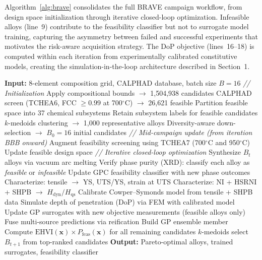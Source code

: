 Algorithm~\ref{alg:brave} consolidates the full BRAVE campaign workflow, from design space initialization through iterative closed-loop optimization. Infeasible alloys (line~9) contribute to the feasibility classifier but not to surrogate model training, capturing the asymmetry between failed and successful experiments that motivates the risk-aware acquisition strategy. The DoP objective (lines~16--18) is computed within each iteration from experimentally calibrated constitutive models, creating the simulation-in-the-loop architecture described in Section~1.

\begin{algorithm}[!htbp]
\caption{BRAVE: Bayesian Risk-Aware Alloy Discovery and Exploration}\label{alg:brave}
\begin{algorithmic}[1]
\Statex \textbf{Input:} 8-element composition grid, CALPHAD database, batch size $B = 16$
\Statex
\Statex \textit{// Initialization}
\State Apply compositional bounds $\rightarrow$ 1,504,938 candidates
\State CALPHAD screen (TCHEA6, FCC $\geq 0.99$ at 700$^\circ$C) $\rightarrow$ 26,621 feasible
\State Partition feasible space into 37 chemical subsystems
\State Retain subsystem labels for feasible candidates
\State $k$-medoids clustering $\rightarrow$ 1,000 representative alloys
\State Diversity-aware down-selection $\rightarrow$ $B_0 = 16$ initial candidates
\Statex
\Statex \textit{// Mid-campaign update (from iteration BBB onward)}
\State Augment feasibility screening using TCHEA7 (700$^\circ$C and 950$^\circ$C)
\State Update feasible design space
\Statex
\Statex \textit{// Iterative closed-loop optimization}
    \State Synthesize $B_t$ alloys via vacuum arc melting
    \State Verify phase purity (XRD): classify each alloy as \textit{feasible} or \textit{infeasible}
    \State Update GPC feasibility classifier with new phase outcomes
        \State Characterize: tensile $\rightarrow$ YS, UTS/YS, strain at UTS
        \State Characterize: NI + HSRNI + SHPB $\rightarrow$ $H_\text{dyn}/H_\text{qs}$
        \State Calibrate Cowper--Symonds model from tensile + SHPB data
        \State Simulate depth of penetration (DoP) via FEM with calibrated model
    \EndFor
    \State Update GP surrogates with new objective measurements (feasible alloys only)
    \State Fuse multi-source predictions via reification
        \State Build GP ensemble member
        \State Compute $\textrm{EHVI}(\mathbf{x}) \times P_\text{feas}(\mathbf{x})$ for all remaining candidates
    \EndFor
    \State $k$-medoids select $B_{t+1}$ from top-ranked candidates
\EndFor
\Statex
\Statex \textbf{Output:} Pareto-optimal alloys, trained surrogates, feasibility classifier
\end{algorithmic}
\end{algorithm}


